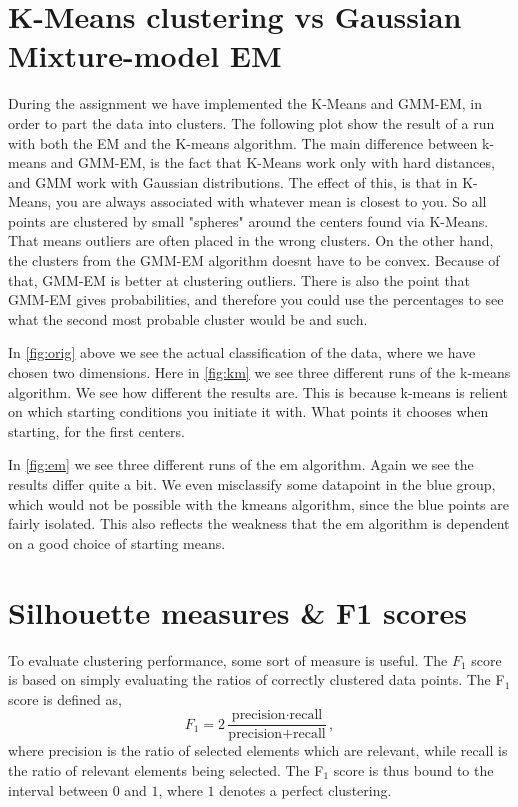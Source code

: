 \documentclass[a4paper,10pt,article,oneside,english]{memoir}
\begin{document}
\section*{K-Means clustering vs Gaussian Mixture-model EM}
During the assignment we have implemented the K-Means and GMM-EM, in order to part the data into clusters. The following plot show the result of a run with both the EM and the K-means algorithm.
The main difference between k-means and GMM-EM, is the fact that K-Means work only with hard distances, and GMM work with Gaussian distributions. The effect of this, is that in K-Means, you are always associated with whatever mean is closest to you. So all points are clustered by small "spheres" around the centers found via K-Means. That means outliers are often placed in the wrong clusters. On the other hand, the clusters from the GMM-EM algorithm doesnt have to be convex. Because of that, GMM-EM is better at clustering outliers.
There is also the point that GMM-EM gives probabilities, and therefore you could use the percentages to see what the second most probable cluster would be and such.

In \ref{fig:orig} above we see the actual classification of the data, where we have chosen two dimensions.
Here in \ref{fig:km} we see three different runs of the k-means algorithm. We see how different the results are. This is because k-means is relient on which starting conditions you initiate it with. What points it chooses when starting, for the first centers.

In \ref{fig:em} we see three different runs of the em algorithm. Again we see the results differ quite a bit. We even misclassify some datapoint in the blue group, which would not be possible with the kmeans algorithm, since the blue points are fairly isolated. This also reflects the weakness that the em algorithm is dependent on a good choice of starting means.




\section*{Silhouette measures \& F1 scores}
To evaluate clustering performance, some sort of measure is useful. The $F_1$ score is based on simply evaluating the ratios of correctly clustered data points. The F$_1$ score is defined as,
$$F_1 = 2 \frac{\text{precision} \cdot \text{recall}}{\text{precision} + \text{recall}},$$
where precision is the ratio of selected elements which are relevant, while recall is the ratio of relevant elements being selected. The F$_1$ score is thus bound to the interval between $0$ and $1$, where $1$ denotes a perfect clustering. 
\end{document}
